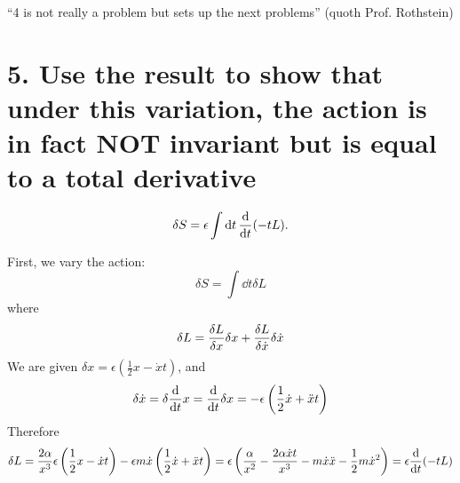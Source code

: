 \documentclass[a4paper,twoside]{article}
\begin{document}
\begin{problem}
    ``4 is not really a problem but sets up the next problems'' (quoth Prof. Rothstein)
\end{problem}
\section*{5. Use the result to show that under this variation, the action is in fact NOT invariant but is equal to a total derivative}
\begin{equation}
    \delta S = \epsilon \int \dd{t} \dv{t}(-tL).
\end{equation}

\begin{problem}
    First, we vary the action:
    \begin{equation}
        \delta S = \int \dd{t} \delta L
    \end{equation}
    where
    \begin{equation}
        \delta L = \fdv{L}{x} \delta x + \fdv{L}{\dot{x}} \delta \dot{x}
    \end{equation}
    We are given $ \delta x = \epsilon \left( \frac{1}{2} x - \dot{x} t \right) $, and
    \begin{equation}
        \delta \dot{x} = \delta \dv{t} x = \dv{t} \delta x = - \epsilon \left( \frac{1}{2} \dot{x} + \ddot{x}t \right)
    \end{equation}
    Therefore
    \begin{equation}
        \delta L = \frac{2 \alpha}{x^3} \epsilon \left( \frac{1}{2} x - \dot{x} t \right) - \epsilon m \dot{x} \left( \frac{1}{2} \dot{x} + \ddot{x} t \right) = \epsilon \left( \frac{\alpha}{x^2} - \frac{2 \alpha \dot{x} t}{x^3} - m \dot{x}\ddot{x} - \frac{1}{2} m \dot{x}^2 \right) = \epsilon \dv{t}(-tL)
    \end{equation}
\end{problem}
\end{document}

